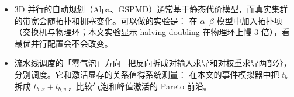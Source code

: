 \begin{research}
\begin{itemize}
\item 3D 并行的自动规划（Alpa、GSPMD）通常基于静态代价模型，而真实集群的带宽会随拓扑和拥塞变化。可以做的实验是：
在 $\alpha$--$\beta$ 模型中加入拓扑项（交换机与物理环；本文实验显示 halving-doubling 在物理环上慢 3 倍），看最优并行配置会不会改变。
\item 流水线调度的「零气泡」方向~\cite{qi2024zerobubble} 把反向拆成对输入求导和对权重求导两部分，分别调度。它和激活显存的关系值得系统测量：
在本文的事件模拟器中把 $t_b$ 拆成 $t_{b,x}+t_{b,w}$，比较气泡和峰值激活的 Pareto 前沿。
\end{itemize}
\end{research}
